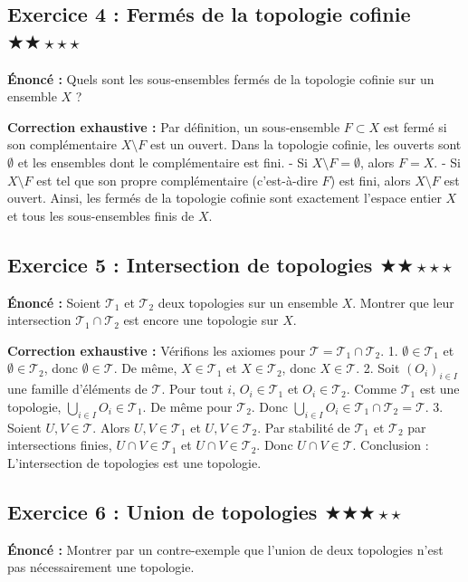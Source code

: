 \documentclass[11pt,a4paper]{article}
\begin{document}
\subsection*{Exercice 4 : Fermés de la topologie cofinie \quad $\bigstar\bigstar\star\star\star$}
\textbf{Énoncé :}
Quels sont les sous-ensembles fermés de la topologie cofinie sur un ensemble $X$ ?

\textbf{Correction exhaustive :}
Par définition, un sous-ensemble $F \subset X$ est fermé si son complémentaire $X \setminus F$ est un ouvert.
Dans la topologie cofinie, les ouverts sont $\emptyset$ et les ensembles dont le complémentaire est fini.
- Si $X \setminus F = \emptyset$, alors $F = X$.
- Si $X \setminus F$ est tel que son propre complémentaire (c'est-à-dire $F$) est fini, alors $X \setminus F$ est ouvert.
Ainsi, les fermés de la topologie cofinie sont exactement l'espace entier $X$ et tous les sous-ensembles finis de $X$.
\subsection*{Exercice 5 : Intersection de topologies \quad $\bigstar\bigstar\star\star\star$}
\textbf{Énoncé :}
Soient $\mathcal{T}_1$ et $\mathcal{T}_2$ deux topologies sur un ensemble $X$. Montrer que leur intersection $\mathcal{T}_1 \cap \mathcal{T}_2$ est encore une topologie sur $X$.

\textbf{Correction exhaustive :}
Vérifions les axiomes pour $\mathcal{T} = \mathcal{T}_1 \cap \mathcal{T}_2$.
1. $\emptyset \in \mathcal{T}_1$ et $\emptyset \in \mathcal{T}_2$, donc $\emptyset \in \mathcal{T}$. De même, $X \in \mathcal{T}_1$ et $X \in \mathcal{T}_2$, donc $X \in \mathcal{T}$.
2. Soit $(O_i)_{i \in I}$ une famille d'éléments de $\mathcal{T}$. Pour tout $i$, $O_i \in \mathcal{T}_1$ et $O_i \in \mathcal{T}_2$. Comme $\mathcal{T}_1$ est une topologie, $\bigcup_{i \in I} O_i \in \mathcal{T}_1$. De même pour $\mathcal{T}_2$. Donc $\bigcup_{i \in I} O_i \in \mathcal{T}_1 \cap \mathcal{T}_2 = \mathcal{T}$.
3. Soient $U, V \in \mathcal{T}$. Alors $U, V \in \mathcal{T}_1$ et $U, V \in \mathcal{T}_2$. Par stabilité de $\mathcal{T}_1$ et $\mathcal{T}_2$ par intersections finies, $U \cap V \in \mathcal{T}_1$ et $U \cap V \in \mathcal{T}_2$. Donc $U \cap V \in \mathcal{T}$.
Conclusion : L'intersection de topologies est une topologie.
\subsection*{Exercice 6 : Union de topologies \quad $\bigstar\bigstar\bigstar\star\star$}
\textbf{Énoncé :}
Montrer par un contre-exemple que l'union de deux topologies n'est pas nécessairement une topologie.
\end{document}
